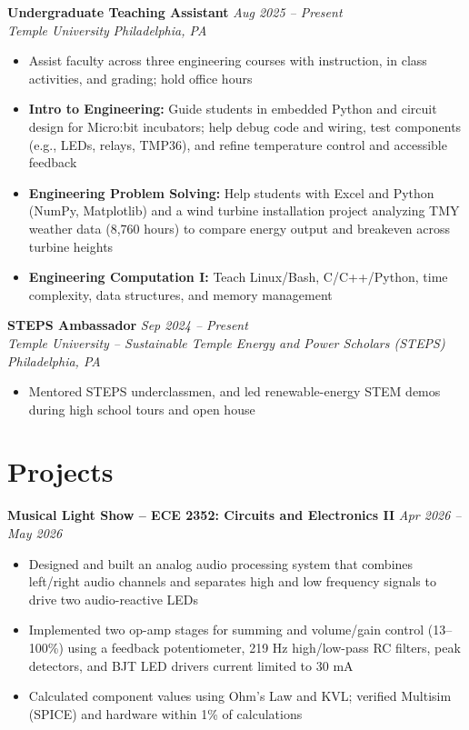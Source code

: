 \documentclass[11pt, letterpaper]{article}
\newcommand{\roleentry}[4]{%
    \noindent\textbf{#1} \hfill \textit{#2} \\
    \textit{#3} \hfill \textit{#4}%
    \vspace{0pt}
}
\newcommand{\projectentry}[2]{%
    \noindent\textbf{#1} \hfill \textit{#2}%
    \vspace{0pt}
}
\begin{document}
\vspace{1pt}
\roleentry{Undergraduate Teaching Assistant}{Aug 2025 -- Present}%
    {Temple University}{Philadelphia, PA}
\begin{itemize}
    \item Assist faculty across three engineering courses with instruction, in class activities, and grading; hold office hours
    \item \textbf{Intro to Engineering:} Guide students in embedded Python and circuit design for Micro:bit incubators; help debug code and wiring, test components (e.g., LEDs, relays, TMP36), and refine temperature control and accessible feedback
    \item \textbf{Engineering Problem Solving:} Help students with Excel and Python (NumPy, Matplotlib) and a wind turbine installation project analyzing TMY weather data (8,760 hours) to compare energy output and breakeven across turbine heights
    \item \textbf{Engineering Computation I:} Teach Linux/Bash, C/C++/Python, time complexity, data structures, and memory management
\end{itemize}

\vspace{1pt}
\roleentry{STEPS Ambassador}{Sep 2024 -- Present}%
    {Temple University -- Sustainable Temple Energy and Power Scholars (STEPS)}{Philadelphia, PA}
\begin{itemize}
    \item Mentored STEPS underclassmen, and led renewable-energy STEM demos during high school tours and open house
\end{itemize}

\vspace{2pt}

\section{Projects}

\projectentry{Musical Light Show -- ECE 2352: Circuits and Electronics II}{Apr 2026 -- May 2026}
\begin{itemize}
    \item Designed and built an analog audio processing system that combines left/right audio channels and separates high and low frequency signals to drive two audio-reactive LEDs
    \item Implemented two op-amp stages for summing and volume/gain control (13--100\%) using a feedback potentiometer, 219 Hz high/low-pass RC filters, peak detectors, and BJT LED drivers current limited to 30 mA
    \item Calculated component values using Ohm's Law and KVL; verified Multisim (SPICE) and hardware within 1\% of calculations
\end{itemize}
\end{document}
